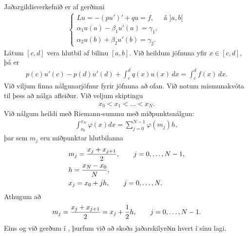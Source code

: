 \documentclass[a4paper,10pt,icelandic]{sphinxmanual}
\begin{document}
Jaðargildisverkefnið er af gerðinni
\begin{equation*}
\begin{split}\begin{cases}
Lu=-(pu')'+qu=f,& \text{á } ]a,b[\\
\alpha_1u(a)-\beta_1u'(a)=\gamma_1,\\
\alpha_2u(b)+\beta_2u'(b)=\gamma_2.
\end{cases}\end{split}
\end{equation*}
Látum \([c,d]\) vera hlutbil af bilinu \([a,b]\).
Við heildum jöfnuna yfir \(x\in [c, d]\), þá er
\begin{equation*}
\begin{split}p(c)u'(c)-p(d)u'(d)
+\int_c^d q(x)u(x)\, dx=\int_c^d f(x)\, dx.\end{split}
\end{equation*}
Við viljum finna nálgunarjöfnur fyrir jöfnuna að ofan.
Við notum mismunakvóta til þess að nálga afleiður.
Við veljum skiptingu
\begin{equation*}
\begin{split}x_0 < x_1 < \dots < x_N.\end{split}
\end{equation*}
Við nálgum heildi með Riemann-summu með miðpunktsnálgun:
\begin{equation*}
\begin{split}\int_{x_0}^{x_N} \varphi(x)dx= \sum\limits_{j=0}^{N-1} \varphi(m_j)h,\end{split}
\end{equation*}
þar sem \(m_j\) eru miðpunktar hlutbilanna
\begin{equation*}
\begin{split}& m_j= {x_j+ x_{j+1}\over 2}, \qquad j=0, \dots, N-1,\\
& h = {x_N - x_{0}\over N},\\
& x_j= x_0+ j h, \qquad j=0, \dots, N.\end{split}
\end{equation*}
Athugum að
\begin{equation*}
\begin{split}m_j= {x_j+ x_{j+1}\over 2}= x_j+ {1\over 2} h, \qquad j=0, \dots, N-1.\end{split}
\end{equation*}
Eins og við gerðum í {\hyperref[\detokenize{Kafli05:ch-5-1}]{}}, þurfum við að skoða jaðarskilyrðin hvert í sínu lagi.
\end{document}
